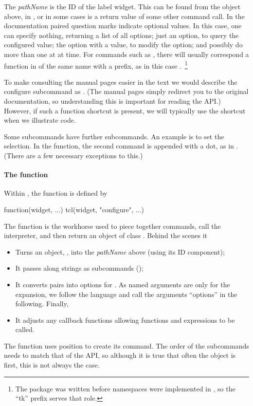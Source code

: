 The \textit{pathName} is the ID of the label widget. This can be found
from the object  above, in , or in some cases is a
return value of some other command call.  In the \TK\/ documentation
paired question marks indicate optional values. In this case, one can
specify nothing, returning a list of all options; just an option, to
query the configured value; the option with a value, to modify the
option; and possibly do more than one at at time.  For commands such
as , there will usually correspond a function in
\R\/ of the same name with a  prefix, as in this case
.~\footnote{The package  was written before
namespaces were implemented in \R, so the ``tk'' prefix serves that role.}

To make consulting the \TK\/ manual pages easier in the text we would
describe the configure subcommand as
. (The \R\/ manual pages
simply redirect you to the original \TK\/ documentation, so
understanding this is important for reading the API.) However, if such
a function shortcut is present, we will typically use the shortcut when we
illustrate code. 

Some subcommands have further subcommands. An example
is to set the selection. In the \R\/ function, the second command is
appended with a dot, as in . (There are a few
necessary exceptions to this.)

\paragraph{The  function} 
Within , the  function is defined by

\begin{Sinput}
function(widget, ...) tcl(widget, "configure", ...)
\end{Sinput}

The  function is the workhorse used to piece
together \TCL\/ commands, call the interpreter, and then return an
object of class .  Behind the scenes it
\begin{itemize}
\item Turns an \R\/
object, , into the \textit{pathName} above (using its ID
component);
\item It passes along strings as subcommands ();
\item It converts \R\/  pairs into 
  options for \TCL. As named arguments are only for the  expansion, we follow the \TCL\/ language and call the
  arguments ``options'' in the following. Finally,
\item It adjusts any callback functions allowing \R{} functions and
  expressions to be called.
\end{itemize}
The  function uses position to create its command. The
order of the subcommands needs to match that of the \TK\/ API, so
although it is true that often the \R\/ object is first, this is not
always the case.


